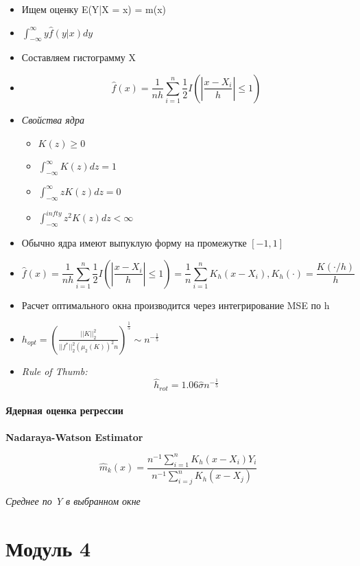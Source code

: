 \documentclass[a4paper, 12pt]{article}
\begin{document}
\begin{itemize}
    \item Ищем оценку E(Y|X = x) = m(x)
    \item $\int_{-\infty}^{\infty}y\hat{f}(y|x)dy$
    \item Составляем гистограмму X
    \item \[\hat{f}(x) = \frac{1}{nh}\sum_{i = 1}^{n}\frac{1}{2}I(\left|\frac{x - X_{i}}{h}\right| \leq 1)\]
    \item \textit{Свойства ядра}
    \begin{itemize}
        \item $K(z) \geq 0$
        \item $\int_{-\infty}^{\infty}K(z)dz = 1$
        \item $\int_{-\infty}^{\infty}zK(z)dz = 0$
        \item $\int_{-\infty}^{infty}z^{2}K(z)dz < \infty$
    \end{itemize}
    \item Обычно ядра имеют выпуклую форму на промежутке $[-1, 1]$
    \item \[\hat{f}(x) = \frac{1}{nh}\sum_{i = 1}^{n}\frac{1}{2}I(\left|\frac{x - X_{i}}{h}\right| \leq 1) = \frac{1}{n}\sum_{i = 1}^{n}K_{h}(x - X_{i}), K_{h}(\cdot) = \frac{K(\cdot / h)}{h}\]
    \item Расчет оптимального окна производится через интегрирование MSE по h
    \item $h_{opt} = \left(\frac{||K||^{2}_{2}}{||f^{*}||^{2}_{2}(\mu_{2}(K))^{2}n}\right)^{\frac{1}{5}} \sim n^{-\frac{1}{5}}$
    \item \textit{Rule of Thumb:}
    \[\hat{h}_{rot} = 1.06\hat{\sigma}n^{-\frac{1}{5}}\]
\end{itemize}

\subsection{Ядерная оценка регрессии}

\textbf{Nadaraya-Watson Estimator}

\[\hat{m}_{k}(x) = \frac{n^{-1}\sum_{i = 1}^{n}K_{h}(x - X_{i})Y_{i}}{n^{-1}\sum_{i = j}^{n}K_{h}(x - X_{j})}\]

\begin{center}
    \textit{Среднее по Y в выбранном окне}
\end{center}

\newpage

\part{Модуль 4}
\end{document}

